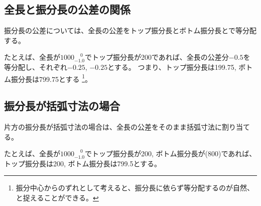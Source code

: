 \clearpage


\subsection{全長と振分長の公差の関係}
振分長の公差については、全長の公差をトップ振分長とボトム振分長とで等分配する。
\begin{hosoku}
たとえば、全長が$1000^{\phantom +0}_{-1.0}$でトップ振分長が200であれば、全長の公差分$-0.5$を等分配し、それぞれ$-0.25$, $-0.25$とする。
つまり、トップ振分長は199.75, ボトム振分長は799.75とする
\footnote{振分中心からのずれとして考えると、振分長に依らず等分配するのが自然、と捉えることができる。}。
\end{hosoku}


\subsection{振分長が括弧寸法の場合}
片方の振分長が括弧寸法の場合は、全長の公差をそのまま括弧寸法に割り当てる。
\begin{hosoku}
たとえば、全長が$1000^{\phantom +0}_{-1.0}$でトップ振分長が200, ボトム振分長が(800)であれば、トップ振分長は200, ボトム振分長は799.5とする。
\end{hosoku}


